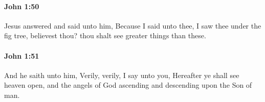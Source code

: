 		\paragraph{John 1:50} %
			\label{JOHN-1-50}

			Jesus answered and said unto him, Because I said unto thee, I saw thee under the fig tree, believest thou? thou shalt see greater things than these.

			\begin{framed}
			\scriptsize
				\begin{compactdesc}
					\item[SBLG] 
				\end{compactdesc}
			\end{framed}

		\paragraph{John 1:51} %
			\label{JOHN-1-51}

			And he saith unto him, Verily, verily, I say unto you, Hereafter ye shall see heaven open, and the angels of God ascending and descending upon the Son of man.

